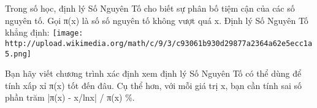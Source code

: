 Trong số học, định lý Số Nguyên Tố cho biết sự phân bố tiệm cận của các số nguyên tố. Gọi π(x) là số số nguyên tố không vượt quá x. Định lý Số Nguyên Tố khẳng định:  
\texttt{[image: http://upload.wikimedia.org/math/c/9/3/c93061b930d29877a2364a62e5ecc1a5.png]}

   Bạn hãy viết chương trình xác định xem định lý Số Nguyên Tố có thể dùng để tính xấp xỉ π(x) tốt đến đâu. Cụ thể hơn, với mỗi giá trị x, bạn cần tính sai số phần trăm |π(x) - x/lnx| / π(x) \%.